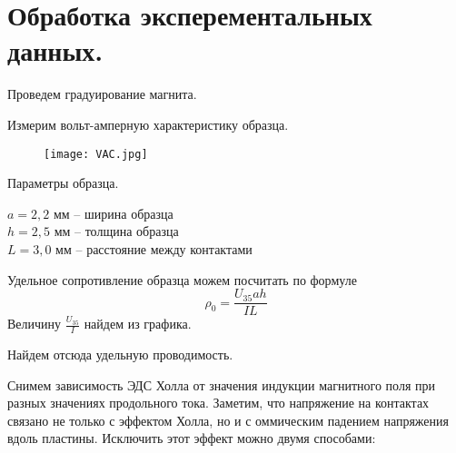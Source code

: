 
% 


    

    \section*{Обработка эксперементальных данных.}

    \noindent Проведем градуирование магнита.
    

    \noindent Измерим вольт-амперную характеристику образца.
    
    
    \begin{figure}[h!]
        \centering
        \texttt{[image: VAC.jpg]}
        \caption{}
    \end{figure}

    \noindent Параметры образца.
    \begin{center}
        $a = 2,2$ мм -- ширина образца              \\
        $h = 2,5$ мм -- толщина образца             \\
        $L = 3,0$ мм -- расстояние между контактами \\
    \end{center}

    \noindent Удельное сопротивление образца можем посчитать по формуле
    \begin{equation*}
        \rho_0 = \frac{U_{35} a h}{I L}
    \end{equation*}
    \noindent Величину $\frac{U_{35}}{I}$ найдем из графика.

    \begin{center}
    \end{center}

    \noindent Найдем отсюда удельную проводимость.

    \begin{center}
    \end{center}

    \noindent Снимем зависимость ЭДС Холла от значения индукции магнитного поля при разных значениях продольного тока.
    Заметим, что напряжение на контактах связано не только с эффектом Холла, но и с 
    оммическим падением напряжения вдоль пластины. Исключить этот эффект можно двумя способами:

